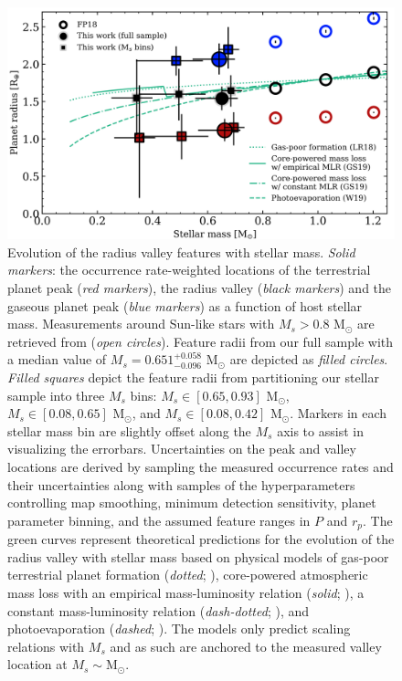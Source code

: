 \documentclass[twocolumn]{emulateapj}
\begin{document}


\begin{figure}
  \centering
  \includegraphics[width=0.85\hsize]{figures/rpvMsFULL_KepK2.png}
  \caption{Evolution of the radius valley features with stellar mass. \emph{Solid markers}:
    the occurrence rate-weighted locations of the terrestrial planet peak (\emph{red markers}), the
    radius valley (\emph{black markers}) and the gaseous planet peak (\emph{blue markers})
    as a function of host stellar mass. Measurements around Sun-like stars with $M_s>0.8$ M$_{\odot}$ are
    retrieved from \cite{fulton18} (\emph{open circles}). Feature radii from our full sample with a median value of
    $M_s = 0.651^{+0.058}_{-0.096}$ M$_{\odot}$ are depicted as \emph{filled circles}. \emph{Filled squares}
    depict the feature radii from partitioning our stellar sample into three $M_s$ bins: $M_s \in [0.65,0.93]$ M$_{\odot}$,
    $M_s \in [0.08,0.65]$ M$_{\odot}$, and $M_s \in [0.08,0.42]$ M$_{\odot}$. Markers in each stellar mass bin are slightly
    offset along the $M_s$ axis to assist in visualizing the errorbars. Uncertainties on the
    peak and valley locations are derived by sampling the measured occurrence rates and their uncertainties along
    with samples of the hyperparameters controlling map smoothing, minimum detection sensitivity, planet parameter
    binning, and the assumed feature ranges in $P$ and $r_p$. The green
    curves represent theoretical predictions for the evolution of the radius valley with stellar mass based on
    physical models of gas-poor terrestrial planet formation (\emph{dotted}; \citealt{lopez18}),
    core-powered atmospheric mass loss
    with an empirical mass-luminosity relation (\emph{solid}; \citealt{gupta19b}), a constant mass-luminosity
    relation (\emph{dash-dotted}; \citealt{gupta19b}), and photoevaporation (\emph{dashed}; \citealt{wu19}).
    The models only predict scaling relations with $M_s$ and as such are anchored to the measured valley location
    at $M_s \sim \text{M}_{\odot}$.}
  \label{fig:rpvMs}
\end{figure}
\end{document}
